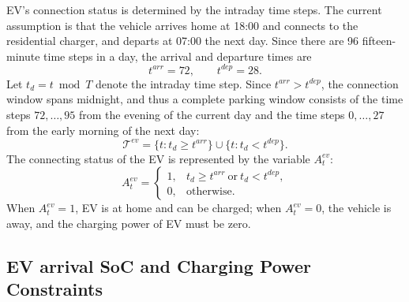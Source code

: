 EV's connection status is determined by the intraday time steps. The current assumption is that the vehicle arrives home at 18:00 and connects to the residential charger, and departs at 07:00 the next day. Since there are 96 fifteen-minute time steps in a day, the arrival and departure times are
\[
  t^{arr}=72,\qquad t^{dep}=28.
\]
Let \(t_d=t\bmod T\) denote the intraday time step. Since \(t^{arr}>t^{dep}\), the connection window spans midnight, and thus a complete parking window consists of the time steps \(72,\ldots,95\) from the evening of the current day and the time steps \(0,\ldots,27\) from the early morning of the next day:
\[
  \mathcal{T}^{ev}
  =
  \{t:t_d\ge t^{arr}\}
  \cup
  \{t:t_d<t^{dep}\}.
\]
The connecting status of the EV is represented by the variable \(A^{ev}_t\):
\[
A^{ev}_t=
\left\{
\begin{array}{ll}
1, & t_d\ge t^{arr}\ \mathrm{or}\ t_d<t^{dep},\\
0, & \mathrm{otherwise}.
\end{array}
\right.
\]
When \(A^{ev}_t=1\), EV is at home and can be charged; when \(A^{ev}_t=0\), the vehicle is away, and the charging power of EV must be zero.

\subsection{EV arrival SoC and Charging Power Constraints}

